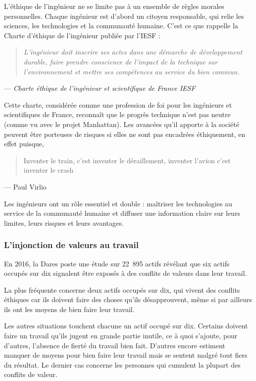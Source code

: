 \documentclass[12pt,a4paper]{report}
\begin{document}
L'éthique de l'ingénieur ne se limite pas à un ensemble de règles morales personnelles. Chaque ingénieur est d'abord un citoyen responsable, qui relie les sciences, les technologies et la communauté humaine. C'est ce que rappelle la Charte d'éthique de l'ingénieur publiée par l'IESF :

\begin{quote}
	\textit{L'ingénieur doit inscrire ses actes dans une démarche de développement durable, faire prendre conscience de l'impact de la technique sur l'environnement et mettre ses compétences au service du bien commun.}
\end{quote}
\hfill --- \textit{Charte éthique de l'ingénieur et scientifique de France IESF}

Cette charte, considérée comme une profession de foi pour les ingénieurs et scientifiques de France, reconnaît que le progrès technique n'est pas neutre (comme vu avec le projet Manhattan). Les avancées qu'il apporte à la société peuvent être porteuses de risques si elles ne sont pas encadrées éthiquement, en effet puisque,
\begin{quote}
Inventer le train, c'est inventer le déraillement, inventer l'avion c'est inventer le crash
\end{quote}
\hfill --- Paul Virlio

Les ingénieurs ont un rôle essentiel et double : maîtriser les technologies au service de la communauté humaine et diffuser une information claire sur leurs limites, leurs risques et leurs avantages.

\subsubsection{L'injonction de valeurs au travail}

En 2016, la Dares poste une étude sur 22~895 actifs révélant que six actifs occupés sur dix signalent être exposés à des conflits de valeurs dans leur travail.

La plus fréquente concerne deux actifs occupés sur dix, qui vivent des conflits éthiques car ils doivent faire des choses qu'ils désapprouvent, même si par ailleurs ils ont les moyens de bien faire leur travail.

Les autres situations touchent chacune un actif occupé sur dix. Certains doivent faire un travail qu'ils jugent en grande partie inutile, ce à quoi s'ajoute, pour d'autres, l'absence de fierté du travail bien fait. D'autres encore estiment manquer de moyens pour bien faire leur travail mais se sentent malgré tout fiers du résultat. Le dernier cas concerne les personnes qui cumulent la plupart des conflits de valeur.
\end{document}
